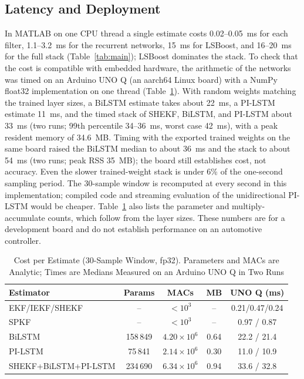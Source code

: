 \documentclass[journal]{IEEEtran}
\begin{document}
\subsection{Latency and Deployment}\label{sec:latency}
In MATLAB on one CPU thread a single estimate costs 0.02--0.05~ms for each filter, 1.1--3.2~ms for the recurrent networks, 15~ms for LSBoost, and 16--20~ms for the full stack (Table~\ref{tab:main}); LSBoost dominates the stack. To check that the cost is compatible with embedded hardware, the arithmetic of the networks was timed on an Arduino UNO Q (an aarch64 Linux board) with a NumPy float32 implementation on one thread (Table~\ref{tab:edge}). With random weights matching the trained layer sizes, a BiLSTM estimate takes about 22~ms, a PI-LSTM estimate 11~ms, and the timed stack of SHEKF, BiLSTM, and PI-LSTM about 33~ms (two runs; 99th percentile 34--36~ms, worst case 42~ms), with a peak resident memory of 34.6~MB. Timing with the exported trained weights on the same board raised the BiLSTM median to about 36~ms and the stack to about 54~ms (two runs; peak RSS 35~MB); the board still establishes cost, not accuracy. Even the slower trained-weight stack is under 6\% of the one-second sampling period. The 30-sample window is recomputed at every second in this implementation; compiled code and streaming evaluation of the unidirectional PI-LSTM would be cheaper. Table~\ref{tab:edge} also lists the parameter and multiply-accumulate counts, which follow from the layer sizes. These numbers are for a development board and do not establish performance on an automotive controller.

\begin{table}[!t]
\caption{Cost per Estimate (30-Sample Window, fp32). Parameters and MACs are Analytic; Times are Medians Measured on an Arduino UNO Q in Two Runs}
\label{tab:edge}
\centering\scriptsize
\setlength{\tabcolsep}{2.4pt}
\begin{tabular}{@{}lcccc@{}}
\toprule
Estimator & Params & MACs & MB & UNO Q (ms)\\
\midrule
EKF/IEKF/SHEKF & -- & $<10^{3}$ & -- & 0.21/0.47/0.24\\
SPKF & -- & $<10^{3}$ & -- & 0.97 / 0.87\\
BiLSTM & 158\,849 & $4.20\times10^{6}$ & 0.64 & 22.2 / 21.4\\
PI-LSTM & 75\,841 & $2.14\times10^{6}$ & 0.30 & 11.0 / 10.9\\
SHEKF+BiLSTM+PI-LSTM & 234\,690 & $6.34\times10^{6}$ & 0.94 & 33.6 / 32.8\\
\bottomrule
\end{tabular}
\end{table}
\end{document}
